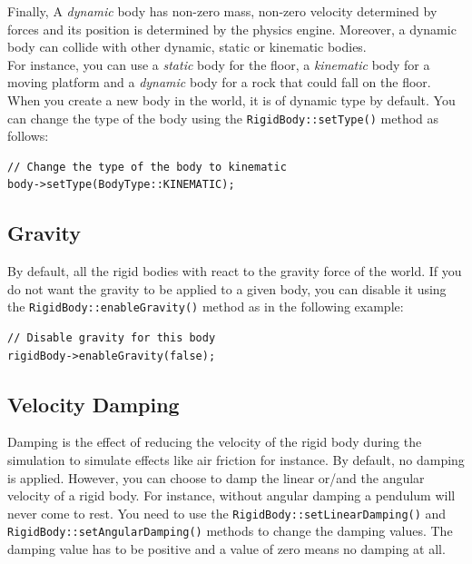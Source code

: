 \documentclass[a4paper,12pt]{article}
\begin{document}
    Finally, A \emph{dynamic} body has non-zero mass, non-zero velocity determined
    by forces and its position is determined by the physics engine. Moreover, a dynamic body can collide with other dynamic, static or
    kinematic bodies. \\

    For instance, you can use a \emph{static} body for the floor, a \emph{kinematic} body for a moving platform and a \emph{dynamic} body for a
    rock that could fall on the floor. \\

    When you create a new body in the world, it is of dynamic type by default. You can change the type of the body using the \texttt{RigidBody::setType()}
    method as follows:\\

    \begin{lstlisting}
// Change the type of the body to kinematic
body->setType(BodyType::KINEMATIC);
  \end{lstlisting}

    \subsection{Gravity}

    By default, all the rigid bodies with react to the gravity force of the world. If you do not want the gravity to be applied to a given body, you can disable
    it using the \texttt{RigidBody::enableGravity()} method as in the following example: \\

    \begin{lstlisting}
// Disable gravity for this body
rigidBody->enableGravity(false);
  \end{lstlisting}


    \subsection{Velocity Damping}

    \begin{sloppypar}
      Damping is the effect of reducing the velocity of the rigid body during the simulation to simulate effects like air friction for instance. By default, no damping
      is applied. However, you can choose to damp the linear or/and the angular velocity of a rigid body. For instance, without angular damping a pendulum will never come
      to rest. You need to use the \texttt{RigidBody::setLinearDamping()} and \texttt{RigidBody::setAngularDamping()} methods to change the damping values. The damping
      value has to be positive and a value of zero means no damping at all.
    \end{sloppypar}
\end{document}
